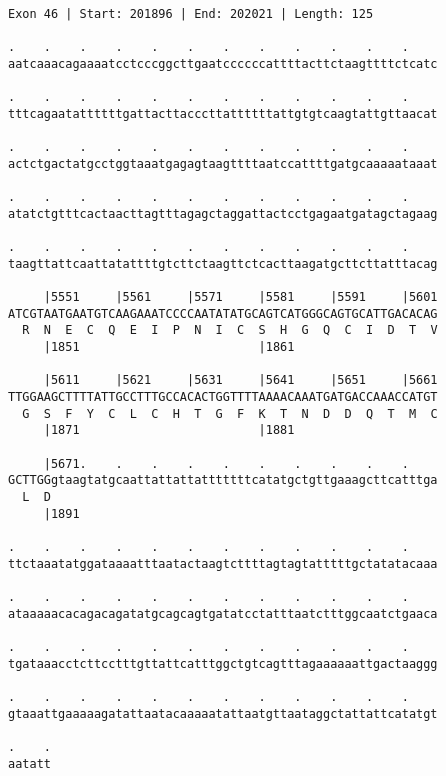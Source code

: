 \documentclass{article}
\begin{document}
\begin{Verbatim}
Exon 46 | Start: 201896 | End: 202021 | Length: 125
 
.    .    .    .    .    .    .    .    .    .    .    .    
aatcaaacagaaaatcctcccggcttgaatccccccattttacttctaagttttctcatc
  
.    .    .    .    .    .    .    .    .    .    .    .    
tttcagaatattttttgattacttacccttattttttattgtgtcaagtattgttaacat
  
.    .    .    .    .    .    .    .    .    .    .    .    
actctgactatgcctggtaaatgagagtaagttttaatccattttgatgcaaaaataaat
  
.    .    .    .    .    .    .    .    .    .    .    .    
atatctgtttcactaacttagtttagagctaggattactcctgagaatgatagctagaag
  
.    .    .    .    .    .    .    .    .    .    .    .    
taagttattcaattatattttgtcttctaagttctcacttaagatgcttcttatttacag
  
     |5551     |5561     |5571     |5581     |5591     |5601
ATCGTAATGAATGTCAAGAAATCCCCAATATATGCAGTCATGGGCAGTGCATTGACACAG
  R  N  E  C  Q  E  I  P  N  I  C  S  H  G  Q  C  I  D  T  V
     |1851                         |1861                    
  
     |5611     |5621     |5631     |5641     |5651     |5661
TTGGAAGCTTTTATTGCCTTTGCCACACTGGTTTTAAAACAAATGATGACCAAACCATGT
  G  S  F  Y  C  L  C  H  T  G  F  K  T  N  D  D  Q  T  M  C
     |1871                         |1881                    
  
     |5671.    .    .    .    .    .    .    .    .    .    
GCTTGGgtaagtatgcaattattattatttttttcatatgctgttgaaagcttcatttga
  L  D                                                      
     |1891                                                  
  
.    .    .    .    .    .    .    .    .    .    .    .    
ttctaaatatggataaaatttaatactaagtcttttagtagtatttttgctatatacaaa
  
.    .    .    .    .    .    .    .    .    .    .    .    
ataaaaacacagacagatatgcagcagtgatatcctatttaatctttggcaatctgaaca
  
.    .    .    .    .    .    .    .    .    .    .    .    
tgataaacctcttcctttgttattcatttggctgtcagtttagaaaaaattgactaaggg
  
.    .    .    .    .    .    .    .    .    .    .    .    
gtaaattgaaaaagatattaatacaaaaatattaatgttaataggctattattcatatgt
  
.    .
aatatt
\end{Verbatim}
\newpage
\end{document}
